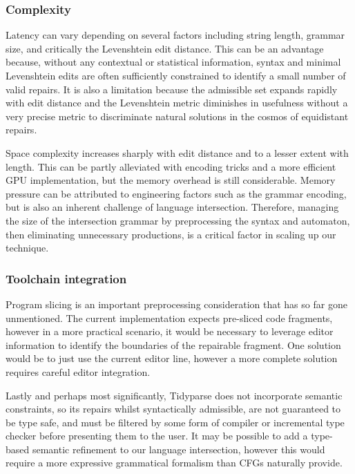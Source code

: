 \documentclass[sigplan,review,acmsmall,nonacm,screen,anonymous]{acmart}\settopmatter{printfolios=false,printccs=false,printacmref=false}
\begin{document}
\subsubsection{Complexity}

Latency can vary depending on several factors including string length, grammar size, and critically the Levenshtein edit distance. This can be an advantage because, without any contextual or statistical information, syntax and minimal Levenshtein edits are often sufficiently constrained to identify a small number of valid repairs. It is also a limitation because the admissible set expands rapidly with edit distance and the Levenshtein metric diminishes in usefulness without a very precise metric to discriminate natural solutions in the cosmos of equidistant repairs.

Space complexity increases sharply with edit distance and to a lesser extent with length. This can be partly alleviated with encoding tricks and a more efficient GPU implementation, but the memory overhead is still considerable. Memory pressure can be attributed to engineering factors such as the grammar encoding, but is also an inherent challenge of language intersection. Therefore, managing the size of the intersection grammar by preprocessing the syntax and automaton, then eliminating unnecessary productions, is a critical factor in scaling up our technique.

\subsubsection{Toolchain integration}

Program slicing is an important preprocessing consideration that has so far gone unmentioned. The current implementation expects pre-sliced code fragments, however in a more practical scenario, it would be necessary to leverage editor information to identify the boundaries of the repairable fragment. One solution would be to just use the current editor line, however a more complete solution requires careful editor integration.

Lastly and perhaps most significantly, Tidyparse does not incorporate semantic constraints, so its repairs whilst syntactically admissible, are not guaranteed to be type safe, and must be filtered by some form of compiler or incremental type checker before presenting them to the user. It may be possible to add a type-based semantic refinement to our language intersection, however this would require a more expressive grammatical formalism than CFGs naturally provide.
\end{document}
